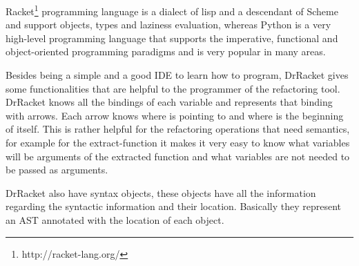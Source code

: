 Racket\footnote{http://racket-lang.org/} programming language is a dialect of lisp and a descendant of Scheme and support objects, types and laziness evaluation,
whereas Python is a very high-level programming language that supports the imperative, functional and object-oriented programming paradigms and is very popular in many areas.

Besides being a simple and a good IDE to learn how to program, DrRacket gives some functionalities that are helpful to the programmer of the refactoring tool. DrRacket knows all the bindings of each variable and represents that binding with arrows. Each arrow knows where is pointing to and where is the beginning of itself. This is rather helpful for the refactoring operations that need semantics, for example for the extract-function it makes it very easy to know what variables will be arguments of the extracted function and what variables are not needed to be passed as arguments.

DrRacket also have syntax objects, these objects have all the information regarding the syntactic information and their location. Basically they represent an AST annotated with the location of each object.




